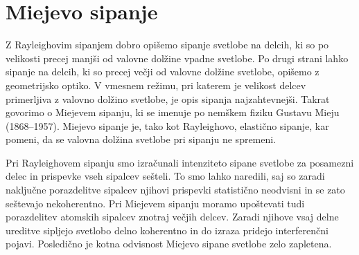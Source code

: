 \section{Miejevo sipanje}
Z Rayleighovim sipanjem dobro opišemo sipanje svetlobe na delcih, ki so 
po velikosti precej manjši od valovne dolžine vpadne svetlobe. Po drugi strani lahko
sipanje na delcih, ki so precej večji od valovne dolžine svetlobe, opišemo
z geometrijsko optiko. V vmesnem režimu, pri katerem je velikost delcev 
primerljiva z valovno dolžino svetlobe, je opis sipanja najzahtevnejši.
Takrat govorimo o Miejevem sipanju, ki se imenuje po nemškem fiziku Gustavu 
Mieju (1868--1957). Miejevo sipanje je, 
tako kot Rayleighovo, elastično sipanje, kar pomeni, da se valovna dolžina svetlobe
pri sipanju ne spremeni. 

Pri Rayleighovem sipanju smo izračunali intenziteto sipane svetlobe za posamezni
delec in prispevke vseh sipalcev sešteli. To smo lahko naredili, saj so 
zaradi naključne porazdelitve sipalcev njihovi prispevki 
statistično neodvisni in se zato seštevajo 
nekoherentno. Pri Miejevem sipanju moramo upoštevati tudi porazdelitev atomskih
sipalcev znotraj večjih delcev. Zaradi njihove vsaj delne ureditve sipljejo
svetlobo delno koherentno in do izraza pridejo interferenčni pojavi. Posledično
je kotna odvisnost Miejevo sipane svetlobe zelo zapletena. 


